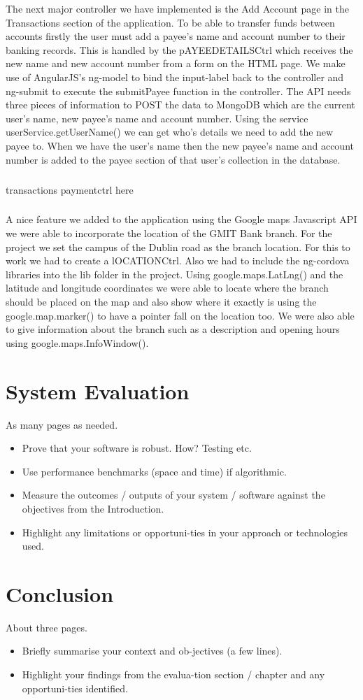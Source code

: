 The next major controller we have implemented is the Add Account page in the Transactions section of the application. To be able to transfer funds between accounts firstly the user must add a payee’s name and account number to their banking records. This is handled by the pAYEEDETAILSCtrl which receives the new name and new account number from a form on the HTML page. We make use of AngularJS’s ng-model to bind the input-label back to the controller and ng-submit to execute the submitPayee function in the controller. The API needs three pieces of information to POST the data to MongoDB which are the current user’s name, new payee’s name and account number. Using the service userService.getUserName() we can get who’s details we need to add the new payee to. When we have the user’s name then the new payee’s name and account number is added to the payee section of that user’s collection in the database.\paragraph{}

transactions paymentctrl here\paragraph{}

A nice feature we added to the application using the Google maps Javascript API we were able to incorporate the location of the GMIT Bank branch. For the project we set the campus of the Dublin road as the branch location. For this to work we had to create a lOCATIONCtrl. Also we had to include the ng-cordova libraries into the lib folder in the project. Using google.maps.LatLng() and the latitude and longitude coordinates we were able to locate where the branch should be placed on the map and also show where it exactly is using the google.map.marker() to have a pointer fall on the location too. We were also able to give information about the branch such as a description and opening hours using google.maps.InfoWindow().\cite{map}




\chapter{System Evaluation}
As many pages as needed.
\begin{itemize}
\item Prove that your software is robust. How? Testing etc.
\item Use performance benchmarks (space and time) if algorithmic.
\item Measure the outcomes / outputs of your system / software against the objectives from the Introduction.
\item Highlight any limitations or opportuni-ties in your approach or technologies used.
\end{itemize}

\chapter{Conclusion}
About three pages.

\begin{itemize}
\item Briefly summarise your context and ob-jectives (a few lines).
\item Highlight your findings from the evalua-tion section / chapter and any opportuni-ties identified.
\end{itemize}
